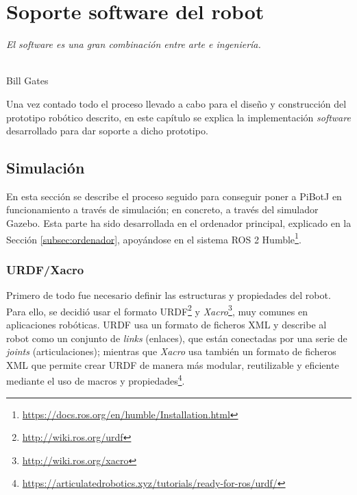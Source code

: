 \chapter{Soporte software del robot}
\label{cap:capitulo6}

\begin{flushright}
\begin{minipage}[]{10cm}
\emph{El software es una gran combinación entre arte e ingeniería.}\\
\end{minipage}\\

Bill Gates\\
\end{flushright}

\vspace{1cm}
\setcounter{footnote}{71}

Una vez contado todo el proceso llevado a cabo para el diseño y construcción del prototipo robótico descrito, en este capítulo se explica la implementación \textit{software} desarrollado para dar soporte a dicho prototipo.

\section{Simulación}
\label{sec:simulacion}

En esta sección se describe el proceso seguido para conseguir poner a PiBotJ en funcionamiento a través de simulación; en concreto, a través del simulador Gazebo. Esta parte ha sido desarrollada en el ordenador principal, explicado en la Sección \ref{subsec:ordenador}, apoyándose en el sistema ROS 2 Humble\footnote{\url{https://docs.ros.org/en/humble/Installation.html}}.

\subsection{URDF/Xacro}
\label{subsec:urdf}

Primero de todo fue necesario definir las estructuras y propiedades del robot. Para ello, se decidió usar el formato \ac{URDF}\footnote{\url{http://wiki.ros.org/urdf}} y \textit{Xacro}\footnote{\url{http://wiki.ros.org/xacro}}, muy comunes en aplicaciones robóticas. \acs{URDF} usa un formato de ficheros XML y describe al robot como un conjunto de \textit{links} (enlaces), que están conectadas por una serie de \textit{joints} (articulaciones); mientras que \textit{Xacro} usa también un formato de ficheros XML que permite crear URDF de manera más modular, reutilizable y eficiente mediante el uso de macros y propiedades\footnote{\url{https://articulatedrobotics.xyz/tutorials/ready-for-ros/urdf/}}.

